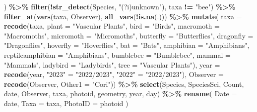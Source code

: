 \documentclass[
]{book}
\newenvironment{Shaded}{\begin{snugshade}}{\end{snugshade}}
\newcommand{\AttributeTok}[1]{\textcolor[rgb]{0.13,0.29,0.53}{#1}}
\newcommand{\FunctionTok}[1]{\textcolor[rgb]{0.13,0.29,0.53}{\textbf{#1}}}
\newcommand{\NormalTok}[1]{#1}
\newcommand{\OtherTok}[1]{\textcolor[rgb]{0.56,0.35,0.01}{#1}}
\newcommand{\SpecialCharTok}[1]{\textcolor[rgb]{0.81,0.36,0.00}{\textbf{#1}}}
\newcommand{\StringTok}[1]{\textcolor[rgb]{0.31,0.60,0.02}{#1}}
\theoremstyle{definition}
\theoremstyle{definition}
\theoremstyle{definition}
\theoremstyle{definition}
\theoremstyle{remark}
\begin{document}
\begin{Shaded}
\begin{Highlighting}[]
\NormalTok{  ) }\SpecialCharTok{\%\textgreater{}\%}
  \FunctionTok{filter}\NormalTok{(}\SpecialCharTok{!}\FunctionTok{str\_detect}\NormalTok{(Species, }\StringTok{"(?i)unknown"}\NormalTok{), taxa }\SpecialCharTok{!=} \StringTok{"bee"}\NormalTok{) }\SpecialCharTok{\%\textgreater{}\%}
  \FunctionTok{filter\_at}\NormalTok{(}\FunctionTok{vars}\NormalTok{(taxa, Observer), }\FunctionTok{all\_vars}\NormalTok{(}\SpecialCharTok{!}\FunctionTok{is.na}\NormalTok{(.))) }\SpecialCharTok{\%\textgreater{}\%}
  \FunctionTok{mutate}\NormalTok{(}
    \AttributeTok{taxa =} \FunctionTok{recode}\NormalTok{(taxa, }
                  \AttributeTok{plant =} \StringTok{"Vascular Plants"}\NormalTok{,}
                  \AttributeTok{bird =} \StringTok{"Birds"}\NormalTok{,}
                  \AttributeTok{macromoth =} \StringTok{"Macromoths"}\NormalTok{,}
                  \AttributeTok{micromoth =} \StringTok{"Micromoths"}\NormalTok{,}
                  \AttributeTok{butterfly =} \StringTok{"Butterflies"}\NormalTok{,}
                  \AttributeTok{dragonfly =} \StringTok{"Dragonflies"}\NormalTok{,}
                  \AttributeTok{hoverfly =} \StringTok{"Hoverflies"}\NormalTok{,}
                  \AttributeTok{bat =} \StringTok{"Bats"}\NormalTok{,}
                  \AttributeTok{amphibian =} \StringTok{"Amphibians"}\NormalTok{,}
                  \AttributeTok{reptileamphibian =} \StringTok{"Amphibians"}\NormalTok{,}
                  \AttributeTok{bumblebee =} \StringTok{"Bumblebee"}\NormalTok{,}
                  \AttributeTok{mammal =} \StringTok{"Mammals"}\NormalTok{,}
                  \AttributeTok{ladybird =} \StringTok{"Ladybirds"}\NormalTok{,}
                  \AttributeTok{tree =} \StringTok{"Vascular Plants"}\NormalTok{),}
    \AttributeTok{year =} \FunctionTok{recode}\NormalTok{(year,}
                  \StringTok{"2023"} \OtherTok{=} \StringTok{"2022/2023"}\NormalTok{,}
                  \StringTok{"2022"} \OtherTok{=} \StringTok{"2022/2023"}\NormalTok{),}
    \AttributeTok{Observer =} \FunctionTok{recode}\NormalTok{(Observer,}
                      \AttributeTok{Other1 =} \StringTok{"Cori"}\NormalTok{)) }\SpecialCharTok{\%\textgreater{}\%}
  \FunctionTok{select}\NormalTok{(Species, SpeciesSci, Count, date, Observer, taxa, photoid, geometry, year, day) }\SpecialCharTok{\%\textgreater{}\%}
  \FunctionTok{rename}\NormalTok{(}
    \AttributeTok{Date =}\NormalTok{ date,}
    \AttributeTok{Taxa =}\NormalTok{ taxa,}
    \AttributeTok{PhotoID =}\NormalTok{ photoid}
\NormalTok{  )}
\end{Highlighting}
\end{Shaded}
\end{document}
